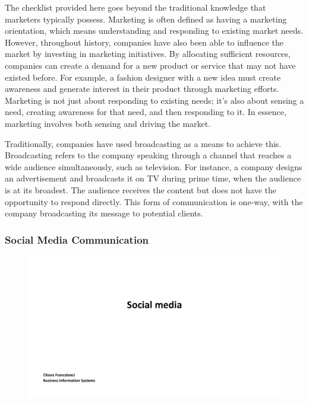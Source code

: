 The checklist provided here goes beyond the traditional knowledge that
marketers typically possess. Marketing is often defined as having a
marketing orientation, which means understanding and responding to
existing market needs. However, throughout history, companies have also
been able to influence the market by investing in marketing initiatives.
By allocating sufficient resources, companies can create a demand for a
new product or service that may not have existed before. For example, a
fashion designer with a new idea must create awareness and generate
interest in their product through marketing efforts. Marketing is not
just about responding to existing needs; it's also about sensing a need,
creating awareness for that need, and then responding to it. In essence,
marketing involves both sensing and driving the market.

Traditionally, companies have used broadcasting as a means to achieve
this. Broadcasting refers to the company speaking through a channel that
reaches a wide audience simultaneously, such as television. For
instance, a company designs an advertisement and broadcasts it on TV
during prime time, when the audience is at its broadest. The audience
receives the content but does not have the opportunity to respond
directly. This form of communication is one-way, with the company
broadcasting its message to potential clients.

\subsubsection{Social Media
    Communication}\label{social-media-communication}

\begin{figure}[!h]
    \centering
    \includegraphics[page=18, trim = 1.5cm 4.5cm 3cm 0.5cm, clip, width=\textwidth]{images/04 - Social_Media.pdf}
\end{figure}

